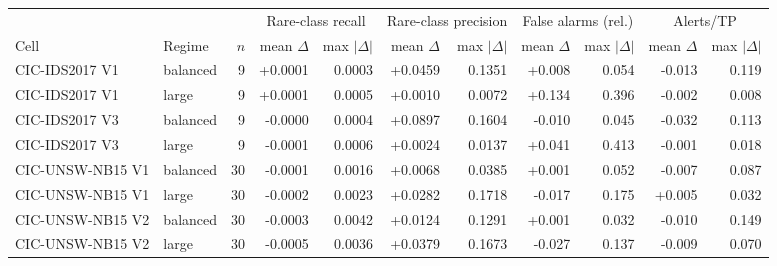 \begin{tabular}{@{}llrrrrrrrrr@{}}
\toprule
 & & & \multicolumn{2}{c}{Rare-class recall} & \multicolumn{2}{c}{Rare-class precision} & \multicolumn{2}{c}{False alarms (rel.)} & \multicolumn{2}{c}{Alerts/TP} \\
\cmidrule(lr){4-5}\cmidrule(lr){6-7}\cmidrule(lr){8-9}\cmidrule(lr){10-11}
Cell & Regime & $n$ & mean $\Delta$ & max $|\Delta|$ & mean $\Delta$ & max $|\Delta|$ & mean $\Delta$ & max $|\Delta|$ & mean $\Delta$ & max $|\Delta|$ \\
\midrule
CIC-IDS2017 V1 & balanced & 9 & +0.0001 & 0.0003 & +0.0459 & 0.1351 & +0.008 & 0.054 & -0.013 & 0.119 \\
CIC-IDS2017 V1 & large & 9 & +0.0001 & 0.0005 & +0.0010 & 0.0072 & +0.134 & 0.396 & -0.002 & 0.008 \\
CIC-IDS2017 V3 & balanced & 9 & -0.0000 & 0.0004 & +0.0897 & 0.1604 & -0.010 & 0.045 & -0.032 & 0.113 \\
CIC-IDS2017 V3 & large & 9 & -0.0001 & 0.0006 & +0.0024 & 0.0137 & +0.041 & 0.413 & -0.001 & 0.018 \\
CIC-UNSW-NB15 V1 & balanced & 30 & -0.0001 & 0.0016 & +0.0068 & 0.0385 & +0.001 & 0.052 & -0.007 & 0.087 \\
CIC-UNSW-NB15 V1 & large & 30 & -0.0002 & 0.0023 & +0.0282 & 0.1718 & -0.017 & 0.175 & +0.005 & 0.032 \\
CIC-UNSW-NB15 V2 & balanced & 30 & -0.0003 & 0.0042 & +0.0124 & 0.1291 & +0.001 & 0.032 & -0.010 & 0.149 \\
CIC-UNSW-NB15 V2 & large & 30 & -0.0005 & 0.0036 & +0.0379 & 0.1673 & -0.027 & 0.137 & -0.009 & 0.070 \\
\bottomrule
\end{tabular}

